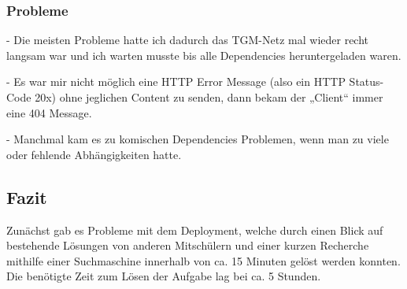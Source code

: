 \subsubsection{Probleme}

- Die meisten Probleme hatte ich dadurch das TGM-Netz mal wieder recht
langsam war und ich warten musste bis alle Dependencies
heruntergeladen waren.

- Es war mir nicht möglich eine HTTP Error Message (also ein HTTP Status-
Code 20x) ohne jeglichen Content zu senden, dann bekam der „Client“
immer eine 404 Message.

- Manchmal kam es zu komischen Dependencies Problemen, wenn man zu
viele oder fehlende Abhängigkeiten hatte.

\subsection{Fazit}
Zunächst gab es Probleme mit dem Deployment, welche durch einen Blick auf bestehende Lösungen von anderen Mitschülern und einer kurzen Recherche mithilfe einer Suchmaschine innerhalb von ca. 15 Minuten gelöst werden konnten. Die benötigte Zeit zum Lösen der Aufgabe lag bei ca. 5 Stunden.